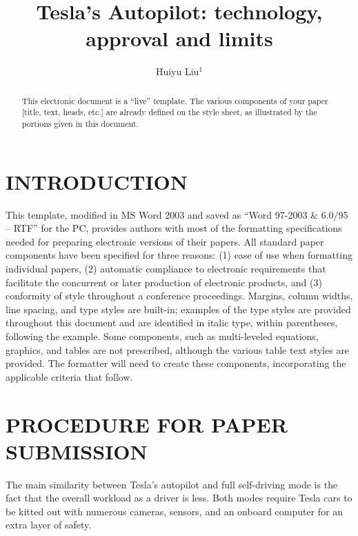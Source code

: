 \documentclass[letterpaper, 10 pt, conference]{ieeeconf}  %
\title{\LARGE \bf
Tesla's Autopilot: technology, approval and limits
}
\author{Huiyu Liu$^{1}$%
%
%
}
\begin{document}
\maketitle
\thispagestyle{empty}
\pagestyle{empty}


\begin{abstract}

This electronic document is a ``live'' template. The various components of your paper [title, text, heads, etc.] are already defined on the style sheet, as illustrated by the portions given in this document.

\end{abstract}


\section{INTRODUCTION}

This template, modified in MS Word 2003 and saved as ``Word 97-2003 \& 6.0/95 -- RTF'' for the PC, provides authors with most of the formatting specifications needed for preparing electronic versions of their papers. All standard paper components have been specified for three reasons: (1) ease of use when formatting individual papers, (2) automatic compliance to electronic requirements that facilitate the concurrent or later production of electronic products, and (3) conformity of style throughout a conference proceedings. Margins, column widths, line spacing, and type styles are built-in; examples of the type styles are provided throughout this document and are identified in italic type, within parentheses, following the example. Some components, such as multi-leveled equations, graphics, and tables are not prescribed, although the various table text styles are provided. The formatter will need to create these components, incorporating the applicable criteria that follow\cite{maitraapproach}.

\section{PROCEDURE FOR PAPER SUBMISSION}

The main similarity between Tesla's autopilot and full self-driving mode is the fact that the overall workload as a driver is less. Both modes require Tesla cars to be kitted out with numerous cameras, sensors, and an onboard computer for an extra layer of safety.
\end{document}
